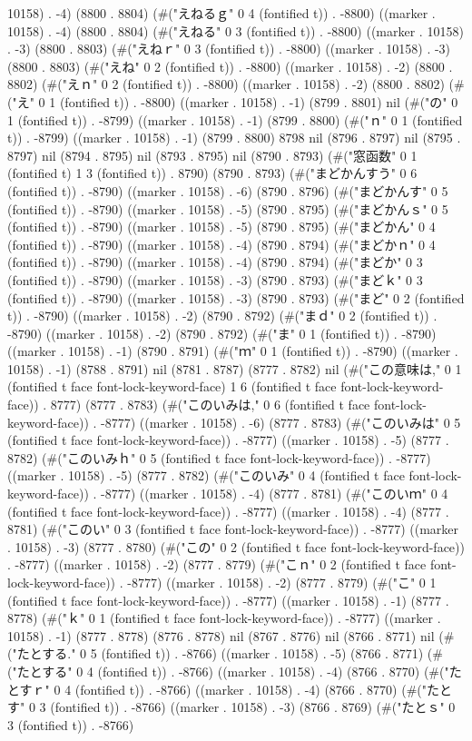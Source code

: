 {10158) . -4) (8800 . 8804) (#("えねるｇ" 0 4 (fontified t)) . -8800) ((marker . 10158) . -4) (8800 . 8804) (#("えねる" 0 3 (fontified t)) . -8800) ((marker . 10158) . -3) (8800 . 8803) (#("えねｒ" 0 3 (fontified t)) . -8800) ((marker . 10158) . -3) (8800 . 8803) (#("えね" 0 2 (fontified t)) . -8800) ((marker . 10158) . -2) (8800 . 8802) (#("えｎ" 0 2 (fontified t)) . -8800) ((marker . 10158) . -2) (8800 . 8802) (#("え" 0 1 (fontified t)) . -8800) ((marker . 10158) . -1) (8799 . 8801) nil (#("の" 0 1 (fontified t)) . -8799) ((marker . 10158) . -1) (8799 . 8800) (#("ｎ" 0 1 (fontified t)) . -8799) ((marker . 10158) . -1) (8799 . 8800) 8798 nil (8796 . 8797) nil (8795 . 8797) nil (8794 . 8795) nil (8793 . 8795) nil (8790 . 8793) (#("窓函数" 0 1 (fontified t) 1 3 (fontified t)) . 8790) (8790 . 8793) (#("まどかんすう" 0 6 (fontified t)) . -8790) ((marker . 10158) . -6) (8790 . 8796) (#("まどかんす" 0 5 (fontified t)) . -8790) ((marker . 10158) . -5) (8790 . 8795) (#("まどかんｓ" 0 5 (fontified t)) . -8790) ((marker . 10158) . -5) (8790 . 8795) (#("まどかん" 0 4 (fontified t)) . -8790) ((marker . 10158) . -4) (8790 . 8794) (#("まどかｎ" 0 4 (fontified t)) . -8790) ((marker . 10158) . -4) (8790 . 8794) (#("まどか" 0 3 (fontified t)) . -8790) ((marker . 10158) . -3) (8790 . 8793) (#("まどｋ" 0 3 (fontified t)) . -8790) ((marker . 10158) . -3) (8790 . 8793) (#("まど" 0 2 (fontified t)) . -8790) ((marker . 10158) . -2) (8790 . 8792) (#("まｄ" 0 2 (fontified t)) . -8790) ((marker . 10158) . -2) (8790 . 8792) (#("ま" 0 1 (fontified t)) . -8790) ((marker . 10158) . -1) (8790 . 8791) (#("ｍ" 0 1 (fontified t)) . -8790) ((marker . 10158) . -1) (8788 . 8791) nil (8781 . 8787) (8777 . 8782) nil (#("この意味は," 0 1 (fontified t face font-lock-keyword-face) 1 6 (fontified t face font-lock-keyword-face)) . 8777) (8777 . 8783) (#("このいみは," 0 6 (fontified t face font-lock-keyword-face)) . -8777) ((marker . 10158) . -6) (8777 . 8783) (#("このいみは" 0 5 (fontified t face font-lock-keyword-face)) . -8777) ((marker . 10158) . -5) (8777 . 8782) (#("このいみｈ" 0 5 (fontified t face font-lock-keyword-face)) . -8777) ((marker . 10158) . -5) (8777 . 8782) (#("このいみ" 0 4 (fontified t face font-lock-keyword-face)) . -8777) ((marker . 10158) . -4) (8777 . 8781) (#("このいｍ" 0 4 (fontified t face font-lock-keyword-face)) . -8777) ((marker . 10158) . -4) (8777 . 8781) (#("このい" 0 3 (fontified t face font-lock-keyword-face)) . -8777) ((marker . 10158) . -3) (8777 . 8780) (#("この" 0 2 (fontified t face font-lock-keyword-face)) . -8777) ((marker . 10158) . -2) (8777 . 8779) (#("こｎ" 0 2 (fontified t face font-lock-keyword-face)) . -8777) ((marker . 10158) . -2) (8777 . 8779) (#("こ" 0 1 (fontified t face font-lock-keyword-face)) . -8777) ((marker . 10158) . -1) (8777 . 8778) (#("ｋ" 0 1 (fontified t face font-lock-keyword-face)) . -8777) ((marker . 10158) . -1) (8777 . 8778) (8776 . 8778) nil (8767 . 8776) nil (8766 . 8771) nil (#("たとする." 0 5 (fontified t)) . -8766) ((marker . 10158) . -5) (8766 . 8771) (#("たとする" 0 4 (fontified t)) . -8766) ((marker . 10158) . -4) (8766 . 8770) (#("たとすｒ" 0 4 (fontified t)) . -8766) ((marker . 10158) . -4) (8766 . 8770) (#("たとす" 0 3 (fontified t)) . -8766) ((marker . 10158) . -3) (8766 . 8769) (#("たとｓ" 0 3 (fontified t)) . -8766) }
